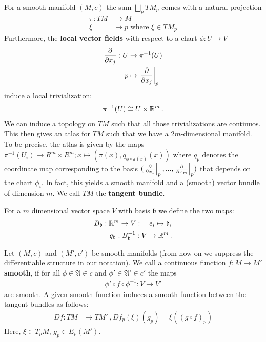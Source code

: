 \begin{definition}
	For a smooth manifold $(M,c)$ the sum $\bigsqcup_pTM_p$ comes with a natural projection 
	\begin{align*}
		\pi: TM &\to M \\
		\xi &\mapsto p \text{ where }\xi \in TM_p 
	\end{align*} Furthermore, the \textbf{local vector fields} with respect to a chart $\phi:U\to V$
	\begin{align*}
		\frac{\partial}{\partial x_j}: U & \to \pi^{-1}(U) \\
		p &\mapsto \left.\frac{\partial}{\partial x_j}\right|_{p}
	\end{align*} induce a local trivialization:
	\begin{align*}
		\pi^{-1}(U)\cong U \times \mathbb{R}^m\, .
	\end{align*} We can induce a topology on $TM$ such that all those trivializations are continuos. This then gives an atlas for $TM$ such that we have a $2m$-dimensional manifold. To be precise, the atlas is given by the maps $\pi^{-1}(U_i)\to R^m\times R^m; x\mapsto (\pi(x),q_{\phi\circ \pi(x)}(x))$ where $q_p$ denotes the coordinate map corresponding to the basis $(\left.\frac{\partial}{\partial x_1}\right|_{p},...,\left.\frac{\partial}{\partial x_m}\right|_{p})$ that depends on the chart $\phi_i$.  In fact, this yields a smooth manifold and a (smooth) vector bundle of dimension $m$. We call $TM$ the \textbf{tangent bundle}.
\end{definition}
\begin{definition}\label{Koordinate maps vector spaces}
	For a $m$ dimensional vector space $V$ with basis $\mathfrak{b}$ we define the two maps:
	\begin{align*}
		B_{\mathfrak{b}}:\mathbb{R}^m\to V: \quad e_i\mapsto \mathfrak{b}_i\\
		q_{\mathfrak{b}}:B_{\mathfrak{b}}^{-1}:V\to \mathbb{R}^m\,.
	\end{align*}
\end{definition}
\begin{definition}
	Let $(M,c)$ and $(M',c')$ be smooth manifolds (from now on we suppress the differentiable structure in our notation). We call a continuous function $f:M \to M'$ \textbf{smooth}, if for all $\phi\in \mathfrak{A}\in c$ and $\phi'\in \mathfrak{A}'\in c'$ the maps
	\begin{align*}
		\phi'\circ f\circ  \phi^{-1}:V\to V'
	\end{align*} are smooth. A given smooth function induces a smooth function between the tangent bundles as follows:
	\begin{align*}
		Df: TM &\to TM' ~,Df_p(\xi)(g_p)=\xi((g\circ f)_p)
	\end{align*}Here, $\xi\in T_pM$, $g_p\in E_p(M')$.
\end{definition}

